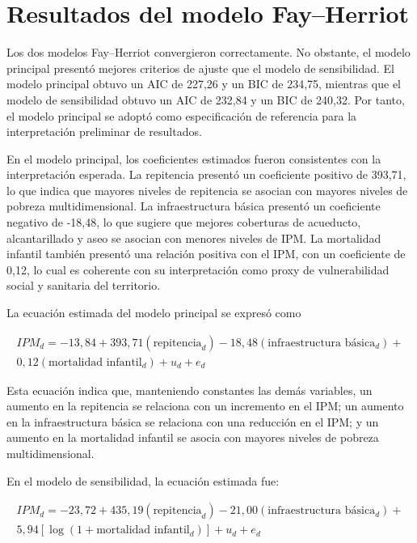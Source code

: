 \section{Resultados del modelo Fay–Herriot}
Los dos modelos Fay–Herriot convergieron correctamente. No obstante, el modelo principal presentó mejores criterios de ajuste que el modelo de sensibilidad. El modelo principal obtuvo un AIC de 227,26 y un BIC de 234,75, mientras que el modelo de sensibilidad obtuvo un AIC de 232,84 y un BIC de 240,32. Por tanto, el modelo principal se adoptó como especificación de referencia para la interpretación preliminar de resultados.

En el modelo principal, los coeficientes estimados fueron consistentes con la interpretación esperada. La repitencia presentó un coeficiente positivo de 393,71, lo que indica que mayores niveles de repitencia se asocian con mayores niveles de pobreza multidimensional. La infraestructura básica presentó un coeficiente negativo de -18,48, lo que sugiere que mejores coberturas de acueducto, alcantarillado y aseo se asocian con menores niveles de IPM. La mortalidad infantil también presentó una relación positiva con el IPM, con un coeficiente de 0,12, lo cual es coherente con su interpretación como proxy de vulnerabilidad social y sanitaria del territorio.

La ecuación estimada del modelo principal se expresó como

\begin{equation}
     \begin{split}
        IPM_d = -13,84 + 393,71(\text{repitencia}_d) - 18,48(\text{infraestructura básica}_d) + \\
        0,12(\text{mortalidad infantil}_d) + u_d + e_d
    \end{split}
\end{equation}

Esta ecuación indica que, manteniendo constantes las demás variables, un aumento en la repitencia se relaciona con un incremento en el IPM; un aumento en la infraestructura básica se relaciona con una reducción en el IPM; y un aumento en la mortalidad infantil se asocia con mayores niveles de pobreza multidimensional.

En el modelo de sensibilidad, la ecuación estimada fue:

\begin{equation}
    \begin{split}
       IPM_d = -23,72 + 435,19(\text{repitencia}_d) - 21,00(\text{infraestructura básica}_d) + \\
       5,94[\log(1 + \text{mortalidad infantil}_d)] + u_d + e_d
    \end{split}
\end{equation}


